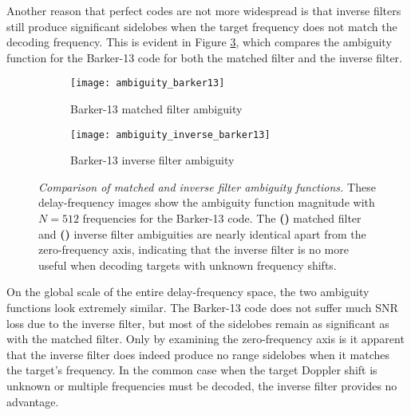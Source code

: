 Another reason that perfect codes are not more widespread is that inverse filters still produce significant sidelobes when the target frequency does not match the decoding frequency. This is evident in Figure \ref{fig:inverse_ambiguity_comparison}, which compares the ambiguity function for the Barker-13 code for both the matched filter and the inverse filter.
\begin{figure}[tpb]
 \centering
 \begin{subfigure}{0.5\textwidth}
  \centering
  \texttt{[image: ambiguity\_barker13]}
  \caption{Barker-13 matched filter ambiguity}
  \label{fig:barker13_matched_ambiguity}
 \end{subfigure}%
 \begin{subfigure}{0.5\textwidth}
  \centering
  \texttt{[image: ambiguity\_inverse\_barker13]}
  \caption{Barker-13 inverse filter ambiguity}
  \label{fig:barker13_inverse_ambiguity}
 \end{subfigure}
 \caption[Comparison of matched and inverse filter ambiguity functions]{\emph{Comparison of matched and inverse filter ambiguity functions.} These delay-frequency images show the ambiguity function magnitude with $N=512$ frequencies for the Barker-13 code. The \textbf{()} matched filter and \textbf{()} inverse filter ambiguities are nearly identical apart from the zero-frequency axis, indicating that the inverse filter is no more useful when decoding targets with unknown frequency shifts.}
 \label{fig:inverse_ambiguity_comparison}
\end{figure}%
On the global scale of the entire delay-frequency space, the two ambiguity functions look extremely similar. The Barker-13 code does not suffer much SNR loss due to the inverse filter, but most of the sidelobes remain as significant as with the matched filter. Only by examining the zero-frequency axis is it apparent that the inverse filter does indeed produce no range sidelobes when it matches the target's frequency. In the common case when the target Doppler shift is unknown or multiple frequencies must be decoded, the inverse filter provides no advantage.

